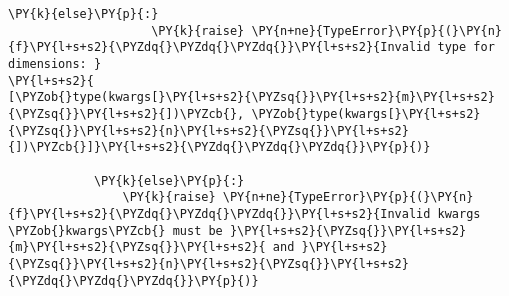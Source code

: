 \begin{Verbatim}[commandchars=\\\{\}]
                \PY{k}{else}\PY{p}{:}
                    \PY{k}{raise} \PY{n+ne}{TypeError}\PY{p}{(}\PY{n}{f}\PY{l+s+s2}{\PYZdq{}\PYZdq{}\PYZdq{}}\PY{l+s+s2}{Invalid type for dimensions: }
\PY{l+s+s2}{                                    [\PYZob{}type(kwargs[}\PY{l+s+s2}{\PYZsq{}}\PY{l+s+s2}{m}\PY{l+s+s2}{\PYZsq{}}\PY{l+s+s2}{])\PYZcb{}, \PYZob{}type(kwargs[}\PY{l+s+s2}{\PYZsq{}}\PY{l+s+s2}{n}\PY{l+s+s2}{\PYZsq{}}\PY{l+s+s2}{])\PYZcb{}]}\PY{l+s+s2}{\PYZdq{}\PYZdq{}\PYZdq{}}\PY{p}{)}

            \PY{k}{else}\PY{p}{:}
                \PY{k}{raise} \PY{n+ne}{TypeError}\PY{p}{(}\PY{n}{f}\PY{l+s+s2}{\PYZdq{}\PYZdq{}\PYZdq{}}\PY{l+s+s2}{Invalid kwargs \PYZob{}kwargs\PYZcb{} must be }\PY{l+s+s2}{\PYZsq{}}\PY{l+s+s2}{m}\PY{l+s+s2}{\PYZsq{}}\PY{l+s+s2}{ and }\PY{l+s+s2}{\PYZsq{}}\PY{l+s+s2}{n}\PY{l+s+s2}{\PYZsq{}}\PY{l+s+s2}{\PYZdq{}\PYZdq{}\PYZdq{}}\PY{p}{)}


\end{Verbatim}
